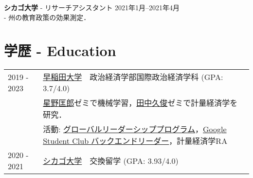 \documentclass[uplatex,dvipdfmx,a4paper,11pt]{jsarticle}
\begin{document}
{ \bf\textcolor{blue(pigment)}{シカゴ大学}} { - リサーチアシスタント} \hfill {2021年1月--2021年4月} 
\\- 州の教育政策の効果測定．

\section{学歴 - Education}
\begin{tabularx}{\linewidth}{@{}l X@{}}	
2019 - 2023 & \uline{早稲田大学}　政治経済学部国際政治経済学科 \hfill \normalsize (GPA: 3.7/4.0) \\
&  \href{https://tadaohoshino.wordpress.com/}{星野匡郎}ゼミで機械学習，\href{https://waseda.pure.elsevier.com/en/persons/hisatoshi-tanaka}{田中久俊}ゼミで計量経済学を研究．\\
& 活動: \href{http://www2.cie-waseda.jp/glfp/jp/about/program.html}{グローバルリーダーシッププログラム}，\href{https://gdsc.community.dev/waseda-university/}{Google Student Club バックエンドリーダー}，計量経済学RA\\
2020 - 2021 & \uline{シカゴ大学}　交換留学 \hfill (GPA: 3.93/4.0) \\
\end{tabularx}



\end{document}
